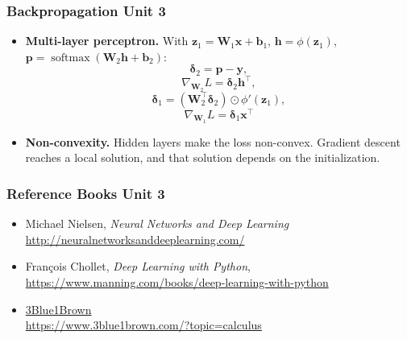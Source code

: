 \documentclass[12pt]{beamer}
\newcommand{\FrameTitle}[2]{\frametitle{#1 \hfill \small\textnormal{\textcolor{midgray}{#2}}}}
\begin{document}
\begin{frame}\FrameTitle{Backpropagation}{Unit 3}
    \begin{itemize}
        \item \textbf{Multi-layer perceptron.} With
            $\symbf{z}_1 = \symbf{W}_1\symbf{x} + \symbf{b}_1$,
            $\symbf{h} = \phi(\symbf{z}_1)$,
            $\symbf{p} = \operatorname{softmax}(\symbf{W}_2\symbf{h} + \symbf{b}_2)$:
                $$\symbf{\delta}_2 = \symbf{p} - \symbf{y},$$
                $$\nabla_{\symbf{W}_2} L = \symbf{\delta}_2 \symbf{h}^\top,$$
                $$\symbf{\delta}_1 = (\symbf{W}_2^\top \symbf{\delta}_2) \odot \phi'(\symbf{z}_1),$$
                $$\nabla_{\symbf{W}_1} L = \symbf{\delta}_1 \symbf{x}^\top$$
        \item \textbf{Non-convexity.} Hidden layers make the loss non-convex.
              Gradient descent reaches a local solution, and that solution
              depends on the initialization.
    \end{itemize}
\end{frame}

\begin{frame}\FrameTitle{Reference Books}{Unit 3}
    \begin{itemize}
        \item Michael Nielsen, \emph{Neural Networks and Deep Learning}\\\vspace*{4pt}
            \href{http://neuralnetworksanddeeplearning.com/}{http://neuralnetworksanddeeplearning.com/}
        \vspace*{8pt}
        \item François Chollet, \emph{Deep Learning with Python},\\\vspace*{4pt}
            \href{https://www.manning.com/books/deep-learning-with-python}{https://www.manning.com/books/deep-learning-with-python}
        \item \href{https://www.3blue1brown.com/}{3Blue1Brown}\\\vspace*{4pt}
            \href{https://www.3blue1brown.com/?topic=calculus}{https://www.3blue1brown.com/?topic=calculus}
    \end{itemize}
\end{frame}
\end{document}
